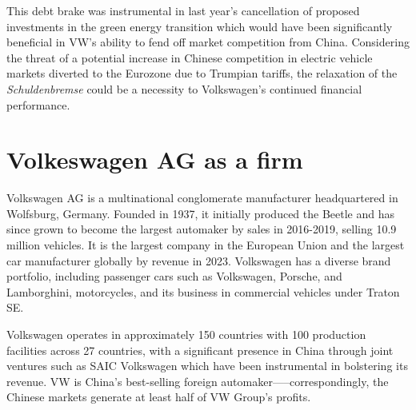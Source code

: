 \documentclass[10pt]{article}
\begin{document}
This debt brake was instrumental in last year's  cancellation of proposed investments in the green energy transition which would have been significantly beneficial in VW's ability to fend off market competition from China. Considering the threat of a potential increase in Chinese competition in electric vehicle markets diverted to the Eurozone due to Trumpian tariffs, the relaxation of the \textit{Schuldenbremse} could be a necessity to Volkswagen's continued financial performance.

\newpage

\section {Volkeswagen AG as a firm}


Volkswagen AG is a multinational conglomerate manufacturer headquartered in Wolfsburg, Germany. Founded in 1937, it initially produced the Beetle and has since grown to become the largest automaker by sales in 2016-2019, selling 10.9 million vehicles. It is the largest company in the European Union and the largest car manufacturer globally by revenue in 2023. Volkswagen has a diverse brand portfolio, including passenger cars such as Volkswagen, Porsche, and Lamborghini, motorcycles, and its business in commercial vehicles under Traton SE\autocite{vwgroupHistory1999}.

Volkswagen operates in approximately 150 countries with 100 production facilities across 27 countries, with a significant presence in China through joint ventures such as SAIC Volkswagen which have been instrumental in bolstering its revenue. VW is China's best-selling foreign automaker—--correspondingly, the Chinese markets generate at least half of VW Group's profits\autocite{whiteVWAuditXinjiang2024}.
\end{document}
